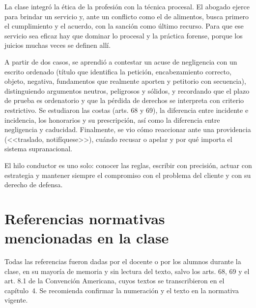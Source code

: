 \documentclass[12pt,oneside]{book}
\begin{document}
La clase integró la ética de la profesión con la técnica procesal. El abogado ejerce para brindar un servicio y, ante un conflicto como el de alimentos, busca primero el cumplimiento y el acuerdo, con la sanción como último recurso. Para que ese servicio sea eficaz hay que dominar lo procesal y la práctica forense, porque los juicios muchas veces se definen allí.

A partir de dos casos, se aprendió a contestar un acuse de negligencia con un escrito ordenado (título que identifica la petición, encabezamiento correcto, objeto, negativa, fundamentos que realmente aporten y petitorio con secuencia), distinguiendo argumentos neutros, peligrosos y sólidos, y recordando que el plazo de prueba es ordenatorio y que la pérdida de derechos se interpreta con criterio restrictivo. Se estudiaron las costas (arts. 68 y 69), la diferencia entre incidente e incidencia, los honorarios y su prescripción, así como la diferencia entre negligencia y caducidad. Finalmente, se vio cómo reaccionar ante una providencia (<<traslado, notifíquese>>), cuándo recusar o apelar y por qué importa el sistema supranacional.

El hilo conductor es uno solo: conocer las reglas, escribir con precisión, actuar con estrategia y mantener siempre el compromiso con el problema del cliente y con su derecho de defensa.

\appendix

\chapter{Referencias normativas mencionadas en la clase}

Todas las referencias fueron dadas por el docente o por los alumnos durante la clase, en su mayoría de memoria y sin lectura del texto, salvo los arts. 68, 69 y el art. 8.1 de la Convención Americana, cuyos textos se transcribieron en el capítulo~4. Se recomienda confirmar la numeración y el texto en la normativa vigente.
\end{document}
